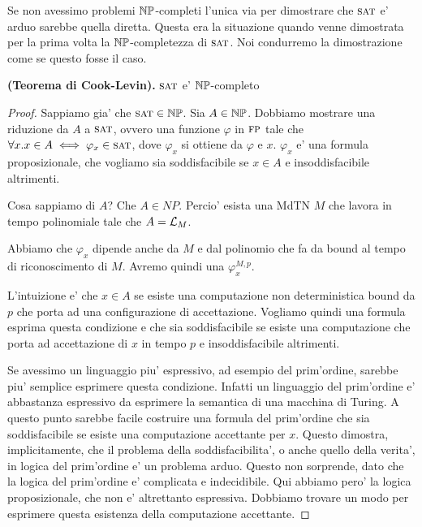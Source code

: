 Se non avessimo problemi $\mathbb{NP}$-completi l'unica via per dimostrare che $\textsc{sat}$ e' arduo sarebbe
quella diretta. Questa era la situazione quando venne dimostrata per la prima volta la
$\mathbb{NP}$-completezza di $\textsc{sat}$. Noi condurremo la dimostrazione come se questo fosse il caso.

\begin{thm}
    \textbf{(Teorema di Cook-Levin).} $\textsc{sat}$ e' $\mathbb{NP}$-completo
\end{thm}
\begin{proof}

    Sappiamo gia' che $\textsc{sat} \in \mathbb{NP}$. Sia $A \in \mathbb{NP}$. Dobbiamo mostrare una riduzione da
    $A$ a $\textsc{sat}$, ovvero una funzione $\varphi$ in $\textsc{fp}$ tale che $\forall x. x \in A \iff
    \varphi_{x} \in \textsc{sat}$, dove $\varphi_{x}$ si ottiene da $\varphi$ e $x$. $\varphi_{x}$ e' una
    formula proposizionale, che vogliamo sia soddisfacibile se $x \in A$ e insoddisfacibile
    altrimenti.

    Cosa sappiamo di $A$? Che $A \in NP$. Percio' esista una MdTN $M$ che lavora in tempo
    polinomiale tale che $A = \mathcal{L}_{M}$.

    Abbiamo che $\varphi_{x}$ dipende anche da $M$ e dal polinomio che fa da bound al tempo di
    riconoscimento di $M$. Avremo quindi una $\varphi_{x}^{M,p}$.

    L'intuizione e' che $x \in A$ se esiste una computazione non deterministica bound da $p$ che
    porta ad una configurazione di accettazione. Vogliamo quindi una formula esprima questa
    condizione e che sia soddisfacibile se esiste una computazione che porta ad accettazione di $x$
    in tempo $p$ e insoddisfacibile altrimenti.

    Se avessimo un linguaggio piu' espressivo, ad esempio del prim'ordine, sarebbe piu' semplice
    esprimere questa condizione. Infatti un linguaggio del prim'ordine e' abbastanza espressivo da
    esprimere la semantica di una macchina di Turing. A questo punto sarebbe facile costruire una
    formula del prim'ordine che sia soddisfacibile se esiste una computazione accettante per $x$.
    Questo dimostra, implicitamente, che il problema della soddisfacibilita', o anche quello della
    verita', in logica del prim'ordine e' un problema arduo. Questo non sorprende, dato che la
    logica del prim'ordine e' complicata e indecidibile. Qui abbiamo pero' la logica proposizionale,
    che non e' altrettanto espressiva.  Dobbiamo trovare un modo per esprimere questa esistenza
    della computazione accettante.


\end{proof}
